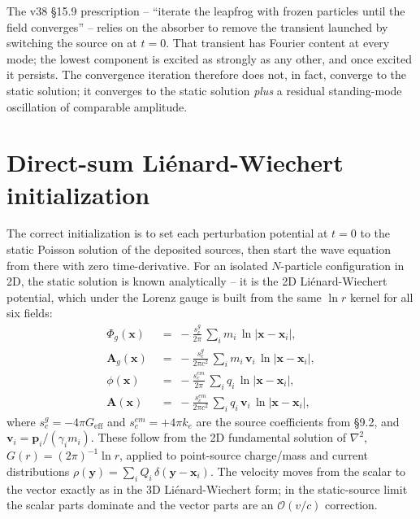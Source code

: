 \documentclass[11pt,a4paper]{article}
\newcommand{\vv}[1]{\mathbf{#1}}
\newcommand{\Phig}{\Phi_g}
\newcommand{\Ag}{\vv{A}_g}
\newcommand{\order}[1]{\mathcal{O}(#1)}
\begin{document}
\vspace{0.5em}
The v38 \S 15.9 prescription -- ``iterate the leapfrog with frozen
particles until the field converges'' -- relies on the absorber to
remove the transient launched by switching the source on at $t=0$.
That transient has Fourier content at every mode; the lowest
component is excited as strongly as any other, and once excited it
persists.  The convergence iteration therefore does not, in fact,
converge to the static solution; it converges to the static solution
\emph{plus} a residual standing-mode oscillation of comparable
amplitude.

\section{Direct-sum Liénard-Wiechert initialization}
\label{sec:lw_init}

The correct initialization is to set each perturbation potential at
$t=0$ to the static Poisson solution of the deposited sources, then
start the wave equation from there with zero time-derivative.  For an
isolated $N$-particle configuration in 2D, the static solution is
known analytically -- it is the 2D Liénard-Wiechert potential, which
under the Lorenz gauge is built from the same $\ln r$ kernel for all
six fields:
\begin{align}
  \Phig(\vv{x})  &\;=\; -\frac{s_c^g}{2\pi}\,\sum_i m_i\,\ln|\vv{x}-\vv{x}_i|,
    \label{eq:phig_lw} \\
  \Ag(\vv{x})  &\;=\; -\frac{s_c^g}{2\pi c^2}\,\sum_i m_i\,\vv{v}_i\,\ln|\vv{x}-\vv{x}_i|,
    \label{eq:Ag_lw} \\
  \phi(\vv{x})  &\;=\; -\frac{s_c^{em}}{2\pi}\,\sum_i q_i\,\ln|\vv{x}-\vv{x}_i|,
    \label{eq:phi_lw} \\
  \vv{A}(\vv{x})  &\;=\; -\frac{s_c^{em}}{2\pi c^2}\,\sum_i q_i\,\vv{v}_i\,\ln|\vv{x}-\vv{x}_i|,
    \label{eq:A_lw}
\end{align}
where $s_c^g = -4\pi G_{\text{eff}}$ and $s_c^{em} = +4\pi k_e$ are
the source coefficients from \S 9.2, and $\vv{v}_i = \vv{p}_i/(\gamma_i
m_i)$.  These follow from the 2D fundamental solution of $\nabla^2$,
$G(r) = (2\pi)^{-1}\ln r$, applied to point-source charge/mass and
current distributions $\rho(\vv{y}) = \sum_i Q_i\,\delta(\vv{y}-\vv{x}_i)$.
The velocity moves from the scalar to the vector exactly as in the
3D Liénard-Wiechert form; in the static-source limit the scalar
parts dominate and the vector parts are an $\order{v/c}$ correction.
\end{document}

